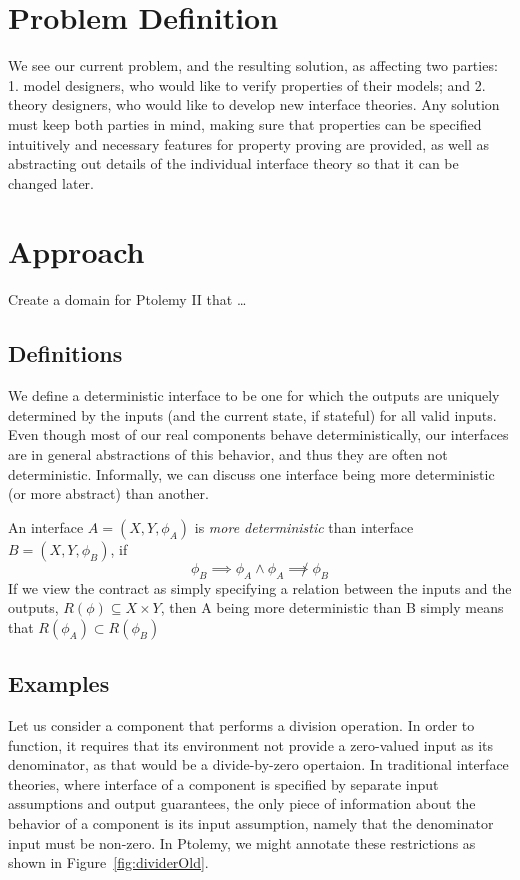 \documentclass[preprint,11pt]{sigplanconf}
\begin{document}
\section{Problem Definition}
We see our current problem, and the resulting solution, as affecting two
parties:
1. model designers, who would like to verify properties of their models;
and
2. theory designers, who would like to develop new interface theories.
%
Any solution must keep both parties in mind, making sure that properties
can be specified intuitively and necessary features for property proving are
provided, as well as abstracting out details of the individual interface theory
so that it can be changed later.

\section{Approach}
Create a domain for Ptolemy II that \dots

\subsection{Definitions}
We define a deterministic interface to be one for which the outputs are
uniquely determined by the inputs (and the current state, if stateful) for all
valid inputs.
Even though most of our real components behave deterministically, our
interfaces are in general abstractions of this behavior, and thus they are
often not deterministic.
Informally, we can discuss one interface being more deterministic (or more
abstract) than another.

An interface $A=(X,Y,\phi_A)$ is \emph{more deterministic} than interface
$B=(X,Y,\phi_B)$, if
\[
\phi_B \implies \phi_A \wedge \phi_A \not\implies \phi_B
\]
If we view the contract as simply specifying a relation between the inputs and
the outputs, $R(\phi) \subseteq X \times Y$, then A being more deterministic
than B simply means that $R(\phi_A) \subset R(\phi_B)$

\subsection{Examples}
Let us consider a component that performs a division operation.  In order to
function, it requires that its environment not provide a zero-valued input as
its denominator, as that would be a divide-by-zero opertaion. In traditional
interface theories, where interface of a component is specified by separate
input assumptions and output guarantees, the only piece of information about
the behavior of a component is its input assumption, namely that the
denominator input must be non-zero. In Ptolemy, we might annotate these
restrictions as shown in Figure~\ref{fig:dividerOld}.
\end{document}
